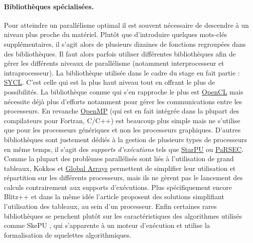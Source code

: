 \paragraph{Bibliothèques spécialisées.}
Pour atteindre un parallélisme optimal il est souvent nécessaire de descendre à un niveau plus proche du matériel. Plutôt que d'introduire quelques mots-clés supplémentaires, il s'agit alors de plusieurs dizaines de fonctions regroupées dans des bibliothèques. Il faut alors parfois utiliser différentes bibliothèques afin de gérer les différents niveaux de parallélisme (notamment interprocesseur et intraprocesseur). La bibliothèque utilisée dans le cadre du stage en fait partie : \textsf{\href{https://www.khronos.org/sycl}{SYCL}}. C'est celle qui est la plus haut niveau tout en offrant le plus de possibilités. La bibliothèque connue qui s'en rapproche le plus est \textsf{\href{https://www.khronos.org/opencl/}{OpenCL}} mais nécessite déjà plus d'efforts notamment pour gérer les communications entre les processeurs. En revanche \textsf{\href{http://openmp.org/wp/}{OpenMP}} (qui est en fait intégrée dans la plupart des compilateurs pour \textsf{Fortran}, \textsf{C/C++}) est beaucoup plus simple mais ne s'utilise que pour les processeurs génériques et non les processeurs graphiques. D'autres bibliothèques sont justement dédiés à la gestion de plusieurs types de processeurs en même temps, il s'agit des \emph{supports d'exécutions} tels que \textsf{\href{http://starpu.gforge.inria.fr/}{StarPU}} ou \textsf{\href{http://icl.utk.edu/parsec/}{PaRSEC}}. Comme la plupart des problèmes parallélisés sont liés à l'utilisation de grand tableaux, \textsf{Kokkos} \cite{Web5} et \textsf{\href{http://hpc.pnl.gov/globalarrays/}{Global Arrays}} permettent de simplifier leur utilisation et répartition sur les différents processeurs, mais ils ne gèrent pas le lancement des calculs contrairement aux supports d'exécutions. Plus spécifiquement encore \textsf{Blitz++} \cite{Art5} et dans la même idée l'article \cite{Art2} proposent des solutions simplifiant l'utilisation des tableaux, au sein d'un processeur. Enfin certaines rares bibliothèques se penchent plutôt sur les caractéristiques des algorithmes utilisés comme \textsf{SkePU} \cite{MstThs1}, qui s'apparente à un moteur d'exécution et utilise la formalisation de squelettes algorithmiques.


